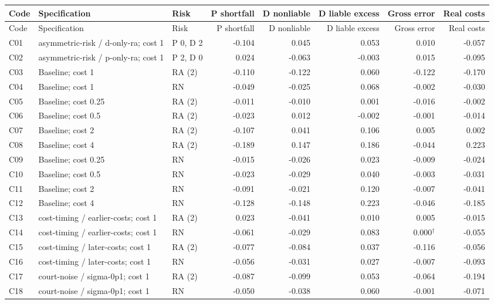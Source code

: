 \documentclass[10pt]{article}
\begin{document}
\small\begin{longtable}{@{}lp{3.0in}lrrrrr@{}}
\toprule Code & Specification & Risk & P shortfall & D nonliable & D liable excess & Gross error & Real costs\\\midrule\endfirsthead
\toprule Code & Specification & Risk & P shortfall & D nonliable & D liable excess & Gross error & Real costs\\\midrule\endhead
\bottomrule\endfoot
C01 & asymmetric-risk / d-only-ra; cost 1 & P 0, D 2 & -0.104 & 0.045 & 0.053 & 0.010 & -0.057\\
C02 & asymmetric-risk / p-only-ra; cost 1 & P 2, D 0 & 0.024 & -0.063 & -0.003 & 0.015 & -0.095\\
C03 & Baseline; cost 1 & RA (2) & -0.110 & -0.122 & 0.060 & -0.122 & -0.170\\
C04 & Baseline; cost 1 & RN & -0.049 & -0.025 & 0.068 & -0.002 & -0.030\\
C05 & Baseline; cost 0.25 & RA (2) & -0.011 & -0.010 & 0.001 & -0.016 & -0.002\\
C06 & Baseline; cost 0.5 & RA (2) & -0.023 & 0.012 & -0.002 & -0.001 & -0.014\\
C07 & Baseline; cost 2 & RA (2) & -0.107 & 0.041 & 0.106 & 0.005 & 0.002\\
C08 & Baseline; cost 4 & RA (2) & -0.189 & 0.147 & 0.186 & -0.044 & 0.223\\
C09 & Baseline; cost 0.25 & RN & -0.015 & -0.026 & 0.023 & -0.009 & -0.024\\
C10 & Baseline; cost 0.5 & RN & -0.023 & -0.029 & 0.040 & -0.003 & -0.031\\
C11 & Baseline; cost 2 & RN & -0.091 & -0.021 & 0.120 & -0.007 & -0.041\\
C12 & Baseline; cost 4 & RN & -0.128 & -0.148 & 0.223 & -0.046 & -0.185\\
C13 & cost-timing / earlier-costs; cost 1 & RA (2) & 0.023 & -0.041 & 0.010 & 0.005 & -0.015\\
C14 & cost-timing / earlier-costs; cost 1 & RN & -0.061 & -0.029 & 0.083 & 0.000$^{\dagger}$ & -0.055\\
C15 & cost-timing / later-costs; cost 1 & RA (2) & -0.077 & -0.084 & 0.037 & -0.116 & -0.056\\
C16 & cost-timing / later-costs; cost 1 & RN & -0.056 & -0.031 & 0.027 & -0.007 & -0.093\\
C17 & court-noise / sigma-0p1; cost 1 & RA (2) & -0.087 & -0.099 & 0.053 & -0.064 & -0.194\\
C18 & court-noise / sigma-0p1; cost 1 & RN & -0.050 & -0.038 & 0.060 & -0.001 & -0.071\\

\end{longtable}
\end{document}
